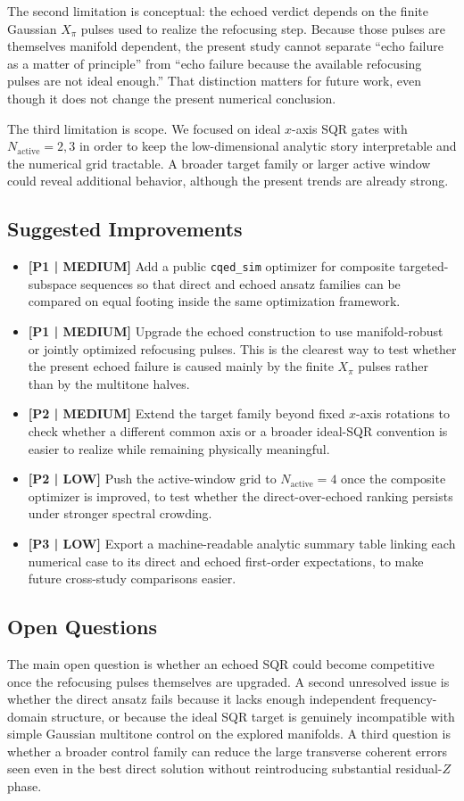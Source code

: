 \documentclass[aps,pra,twocolumn,reprint,floatfix,amsmath,amssymb]{revtex4-2}
\begin{document}
The second limitation is conceptual: the echoed verdict depends on the finite Gaussian $X_\pi$ pulses used to realize the refocusing step. Because those pulses are themselves manifold dependent, the present study cannot separate ``echo failure as a matter of principle'' from ``echo failure because the available refocusing pulses are not ideal enough.'' That distinction matters for future work, even though it does not change the present numerical conclusion.

The third limitation is scope. We focused on ideal $x$-axis SQR gates with $N_{\mathrm{active}}=2,3$ in order to keep the low-dimensional analytic story interpretable and the numerical grid tractable. A broader target family or larger active window could reveal additional behavior, although the present trends are already strong.

\subsection{Suggested Improvements}
\begin{itemize}
  \item \textbf{[P1 | MEDIUM]} Add a public \texttt{cqed\_sim} optimizer for composite targeted-subspace sequences so that direct and echoed ansatz families can be compared on equal footing inside the same optimization framework.
  \item \textbf{[P1 | MEDIUM]} Upgrade the echoed construction to use manifold-robust or jointly optimized refocusing pulses. This is the clearest way to test whether the present echoed failure is caused mainly by the finite $X_\pi$ pulses rather than by the multitone halves.
  \item \textbf{[P2 | MEDIUM]} Extend the target family beyond fixed $x$-axis rotations to check whether a different common axis or a broader ideal-SQR convention is easier to realize while remaining physically meaningful.
  \item \textbf{[P2 | LOW]} Push the active-window grid to $N_{\mathrm{active}}=4$ once the composite optimizer is improved, to test whether the direct-over-echoed ranking persists under stronger spectral crowding.
  \item \textbf{[P3 | LOW]} Export a machine-readable analytic summary table linking each numerical case to its direct and echoed first-order expectations, to make future cross-study comparisons easier.
\end{itemize}

\subsection{Open Questions}
The main open question is whether an echoed SQR could become competitive once the refocusing pulses themselves are upgraded. A second unresolved issue is whether the direct ansatz fails because it lacks enough independent frequency-domain structure, or because the ideal SQR target is genuinely incompatible with simple Gaussian multitone control on the explored manifolds. A third question is whether a broader control family can reduce the large transverse coherent errors seen even in the best direct solution without reintroducing substantial residual-$Z$ phase.
\end{document}
